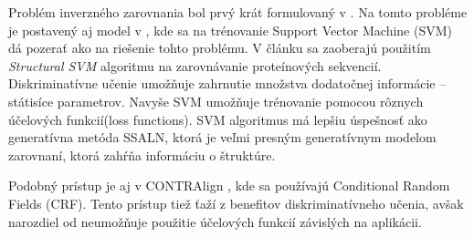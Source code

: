 Problém inverzného zarovnania bol prvý krát formulovaný v \cite{inverseAlign1}. 
Na tomto probléme je postavený aj model v \cite{svmTrainingProteinsAlignment}, kde sa na trénovanie Support Vector Machine (SVM) dá pozerať ako na riešenie tohto problému. V článku sa zaoberajú použitím \textit{Structural SVM} algoritmu na zarovnávanie proteínových sekvencií. Diskriminatívne učenie umožňuje zahrnutie množstva dodatočnej informácie -- státisíce parametrov.
Navyše SVM umožňuje trénovanie pomocou rôznych účelových funkcií(loss functions).
SVM algoritmus má lepšiu úspešnosť ako generatívna metóda SSALN, ktorá je veľmi presným generatívnym modelom zarovnaní, ktorá zahŕňa informáciu o štruktúre. 

Podobný prístup je aj v CONTRAlign \cite{contralign}, kde sa používajú Conditional Random Fields (CRF). Tento prístup tiež ťaží z benefitov diskriminatívneho učenia, avšak narozdiel od \cite{svmTrainingProteinsAlignment} neumožňuje použitie účelových funkcií závislých na aplikácii.
